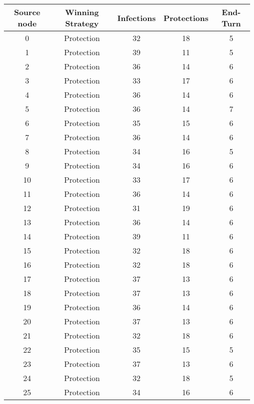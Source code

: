 \documentclass[results.tex]{subfiles}
\begin{document}
\begin{center}
  \begin{tabular}{| c || c | c | c | c |}
    \hline
    {\bfseries Source node} & {\bfseries Winning Strategy} & {\bfseries Infections} & {\bfseries Protections} & {\bfseries End-Turn} \\  %
    \hline\hline
    0 & Protection & 32 & 18 & 5 \\ 
    \hline
    1 & Protection & 39 & 11 & 5 \\ 
    \hline
    2 & Protection & 36 & 14 & 6 \\ 
    \hline
    3 & Protection & 33 & 17 & 6 \\ 
    \hline
    4 & Protection & 36 & 14 & 6 \\ 
    \hline
    5 & Protection & 36 & 14 & 7 \\ 
    \hline
    6 & Protection & 35 & 15 & 6 \\ 
    \hline
    7 & Protection & 36 & 14 & 6 \\ 
    \hline
    8 & Protection & 34 & 16 & 5 \\ 
    \hline
    9 & Protection & 34 & 16 & 6 \\ 
    \hline
    10 & Protection & 33 & 17 & 6 \\ 
    \hline
    11 & Protection & 36 & 14 & 6 \\ 
    \hline
    12 & Protection & 31 & 19 & 6 \\ 
    \hline
    13 & Protection & 36 & 14 & 6 \\ 
    \hline
    14 & Protection & 39 & 11 & 6 \\ 
    \hline
    15 & Protection & 32 & 18 & 6 \\ 
    \hline
    16 & Protection & 32 & 18 & 6 \\ 
    \hline
    17 & Protection & 37 & 13 & 6 \\ 
    \hline
    18 & Protection & 37 & 13 & 6 \\ 
    \hline
    19 & Protection & 36 & 14 & 6 \\ 
    \hline
    20 & Protection & 37 & 13 & 6 \\ 
    \hline
    21 & Protection & 32 & 18 & 6 \\ 
    \hline
    22 & Protection & 35 & 15 & 5 \\ 
    \hline
    23 & Protection & 37 & 13 & 6 \\ 
    \hline
    24 & Protection & 32 & 18 & 5 \\ 
    \hline
    25 & Protection & 34 & 16 & 6 \\ 

\end{tabular}
\end{center}
\end{document}
